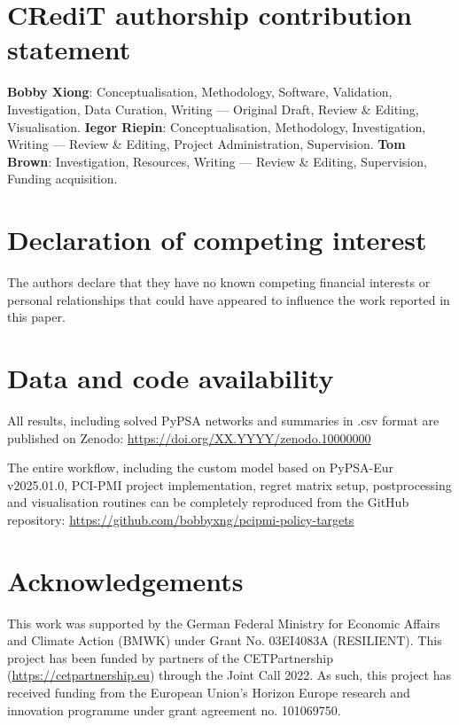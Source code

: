 \documentclass[preprint,12pt,sort&compress]{elsarticle}
\begin{document}
\section*{CRediT authorship contribution statement}
\textbf{Bobby Xiong}: Conceptualisation, Methodology, Software, Validation, Investigation, Data Curation, Writing --- Original Draft, Review \& Editing, Visualisation. \textbf{Iegor Riepin}: Conceptualisation, Methodology, Investigation, Writing --- Review \& Editing, Project Administration, Supervision. \textbf{Tom Brown}: Investigation, Resources, Writing --- Review \& Editing, Supervision, Funding acquisition.

\section*{Declaration of competing interest}
The authors declare that they have no known competing financial interests or personal relationships that could have appeared to influence the work reported in this paper.

\section*{Data and code availability}
All results, including solved PyPSA networks and summaries in .csv format are published on Zenodo: \newline
\href{https://doi.org/XX.YYYY/zenodo.10000000}{https://doi.org/XX.YYYY/zenodo.10000000}

The entire workflow, including the custom model based on PyPSA-Eur v2025.01.0, PCI-PMI project implementation, regret matrix setup, postprocessing and visualisation routines can be completely reproduced from the GitHub repository: \newline 
\href{https://github.com/bobbyxng/pcipmi-policy-targets}{https://github.com/bobbyxng/pcipmi-policy-targets}

\section*{Acknowledgements}
This work was supported by the German Federal Ministry for Economic Affairs and Climate Action (BMWK) under Grant No. 03EI4083A (RESILIENT). This project has been funded by partners of the CETPartnership (\href{https://cetpartnership.eu}{https://cetpartnership.eu}) through the Joint Call 2022. As such, this project has received funding from the European Union's Horizon Europe research and innovation programme under grant agreement no. 101069750.
\end{document}
